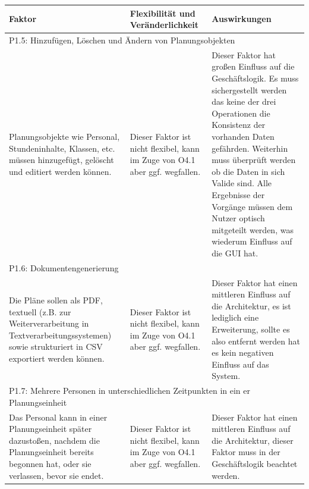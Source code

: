 \documentclass[fontsize=12pt,paper=a4,twoside]{scrartcl}
\begin{document}
\begin{tabularx}{\textwidth}{|X|X|X|}
\hline
\textbf{Faktor} & \textbf{Flexibilität und Veränderlichkeit} & \textbf{Auswirkungen}\\\hline
\hline
\hline
\multicolumn{3}{|l|}{P1.5: Hinzufügen, Löschen und Ändern von Planungsobjekten}\\\hline
Planungsobjekte wie Personal, Stundeninhalte, Klassen, etc. müssen hinzugefügt, gelöscht und editiert werden können.& Dieser Faktor ist nicht flexibel, kann im Zuge von O4.1 aber ggf. wegfallen. & Dieser Faktor hat großen Einfluss auf die Geschäftslogik. Es muss sichergestellt werden das keine der drei Operationen die Konsistenz der vorhanden Daten gefährden. Weiterhin muss überprüft werden ob die Daten in sich Valide sind. Alle Ergebnisse der Vorgänge müssen dem Nutzer optisch mitgeteilt werden, was wiederum Einfluss auf die GUI hat. \\\hline
\multicolumn{3}{|l|}{P1.6: Dokumentengenerierung}\\\hline
Die Pläne sollen als PDF, textuell (z.B. zur Weiterverarbeitung in Textverarbeitungssystemen) sowie strukturiert in CSV exportiert werden können. & Dieser Faktor ist nicht flexibel, kann im Zuge von O4.1 aber ggf. wegfallen. & Dieser Faktor hat einen mittleren Einfluss auf die Architektur, es ist lediglich eine Erweiterung, sollte es also entfernt werden hat es kein negativen Einfluss auf das System. \\\hline
\multicolumn{3}{|l|}{P1.7: Mehrere Personen in unterschiedlichen Zeitpunkten in ein er Planungseinheit}\\\hline
Das Personal kann in einer Planungseinheit später dazustoßen, nachdem die Planungseinheit bereits begonnen hat, oder sie verlassen, bevor sie endet. & Dieser Faktor ist nicht flexibel, kann im Zuge von O4.1 aber ggf. wegfallen. & Dieser Faktor hat einen mittleren Einfluss auf die Architektur, dieser Faktor muss in der Geschäftslogik beachtet werden. \\\hline
\end{tabularx} \newpage
\end{document}
